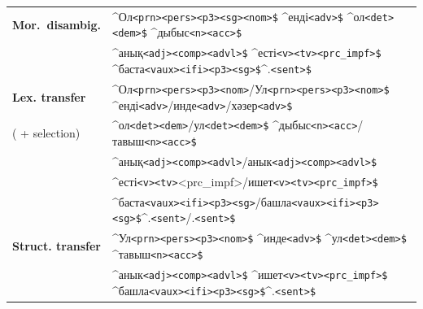 \documentclass[a4paper,11pt]{article}
\newcommand{\tag}[1]{{\small{\texttt{#1}}}}
\begin{document}
\begin{table}[htbp]
\begin{tabular}{ll}
\midrule
{\bf Mor.\ disambig.} & \^{}Ол\tag{<prn>}\tag{<pers>}\tag{<p3>}\tag{<sg>}\tag{<nom>}\tag{\$} \^{}енді\tag{<adv>}\tag{\$} \^{}ол\tag{<det>}\tag{<dem>}\tag{\$} \^{}дыбыс\tag{<n>}\tag{<acc>}\tag{\$} \\
                     & \^{}анық\tag{<adj>}\tag{<comp>}\tag{<advl>}\tag{\$} \^{}есті\tag{<v>}\tag{<tv>}\tag{<prc\_impf>}\tag{\$} \^{}баста\tag{<vaux>}\tag{<ifi>}\tag{<p3>}\tag{<sg>}\tag{\$}\^{}.\tag{<sent>}\tag{\$} \\
\midrule
{\bf Lex. transfer} & \^{}Ол\tag{<prn>}\tag{<pers>}\tag{<p3>}\tag{<nom>}/Ул\tag{<prn>}\tag{<pers>}\tag{<p3>}\tag{<nom>}\tag{\$} \^{}енді\tag{<adv>}/инде\tag{<adv>}/хәзер\tag{<adv>}\tag{\$} \\
 ( + selection)     & \^{}ол\tag{<det>}\tag{<dem>}/ул\tag{<det>}\tag{<dem>}\tag{\$} \^{}дыбыс\tag{<n>}\tag{<acc>}/тавыш\tag{<n>}\tag{<acc>}\tag{\$} \\
                    & \^{}анық\tag{<adj>}\tag{<comp>}\tag{<advl>}/анык\tag{<adj>}\tag{<comp>}\tag{<advl>}\tag{\$}  \\
						  & \^{}есті\tag{<v>}\tag{<tv>}<prc\_impf>/ишет\tag{<v>}\tag{<tv>}\tag{<prc\_impf>}\tag{\$} \\
                    & \^{}баста\tag{<vaux>}\tag{<ifi>}\tag{<p3>}\tag{<sg>}/башла\tag{<vaux>}\tag{<ifi>}\tag{<p3>}\tag{<sg>}\tag{\$}\^{}.\tag{<sent>}/.\tag{<sent>}\tag{\$} \\
\midrule
{\bf Struct. transfer}& \^{}Ул\tag{<prn>}\tag{<pers>}\tag{<p3>}\tag{<nom>}\tag{\$} \^{}инде\tag{<adv>}\tag{\$} \^{}ул\tag{<det>}\tag{<dem>}\tag{\$} \^{}тавыш\tag{<n>}\tag{<acc>}\tag{\$} \\
                      & \^{}анык\tag{<adj>}\tag{<comp>}\tag{<advl>}\tag{\$} \^{}ишет\tag{<v>}\tag{<tv>}\tag{<prc\_impf>}\tag{\$} \^{}башла\tag{<vaux>}\tag{<ifi>}\tag{<p3>}\tag{<sg>}\tag{\$}\^{}.\tag{<sent>}\tag{\$} \\


\end{tabular}
\end{table}
\end{document}
